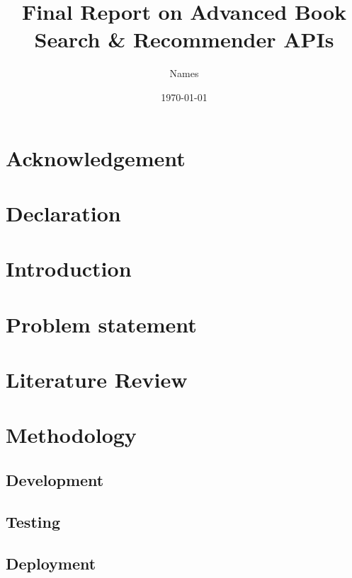 \documentclass{article}
\title{Final Report on Advanced Book Search \& Recommender APIs}
\author{Names}
\date{\today}
\begin{document}
\maketitle

\begin{abstract}
    
\end{abstract}

\newpage

\section*{Acknowledgement}
    
\newpage

\section*{Declaration}
    
\newpage

\tableofcontents
\newpage

\section{Introduction}
    

\section{Problem statement}
    

\section{Literature Review}
    

\section{Methodology}
    

\subsection{Development}
    

\subsection{Testing}
    

\subsection{Deployment}
    
\end{document}
